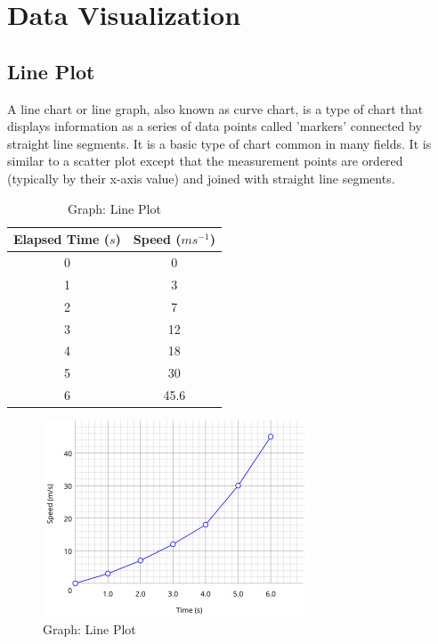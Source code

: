 \chapter{Data Visualization}

\section{Line Plot \cite{wiki-line-chart}}\label{plot_line}
A line chart or line graph, also known as curve chart, is a type of chart that displays information as a series of data points called 'markers' connected by straight line segments. It is a basic type of chart common in many fields. It is similar to a scatter plot except that the measurement points are ordered (typically by their x-axis value) and joined with straight line segments. 


\begin{table}[H]
    \begin{minipage}{0.45\textwidth}
        \centering
        \begin{tabular}{|c|c|}
            \hline
            Elapsed Time ($s$) & Speed ($ms^{-1}$) \\ \hline
            0 & 0 \\ \hline
            1 & 3 \\ \hline
            2 & 7 \\ \hline
            3 & 12 \\ \hline
            4 & 18 \\ \hline
            5 & 30 \\ \hline
            6 & 45.6 \\ \hline
        \end{tabular}
        \caption{Data: Line Plot}
    \end{minipage}
    \hfill
    \begin{minipage}{0.45\textwidth}
        \begin{figure}[H]
            \includegraphics[width=\linewidth]{Pictures/data/data_line_chart.jpg}
            \caption{Graph: Line Plot}
        \end{figure}
    \end{minipage}
\end{table}


